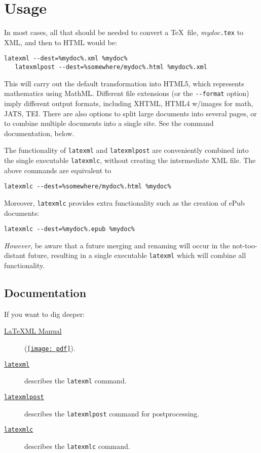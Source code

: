\documentclass{article}
\newcommand{\PDFIcon}{\texttt{[image: pdf]}}
\begin{document}
\section{Usage}\label{ussage}
In most cases, all that should be needed to convert
a \TeX\ file, \textit{mydoc}\texttt{.tex} to XML, and
then to HTML would be:
\begin{lstlisting}[style=shell]
   latexml --dest=%mydoc%.xml %mydoc%
   latexmlpost --dest=%somewhere/mydoc%.html %mydoc%.xml
\end{lstlisting}
This will carry out the default transformation into HTML5,
which represents mathematics using MathML.
Different file extensions (or the \verb|--format| option) imply different output formats,
including XHTML, HTML4 w/images for math, JATS, TEI.
There are also options to split large documents into several pages, or to combine multiple
documents into a single site.  See the command documentation, below.

The functionality of \texttt{latexml} and \texttt{latexmlpost} are conveniently
combined into the single executable \texttt{latexmlc}, without creating the
intermediate XML file.  The above commands are equivalent to
\begin{lstlisting}[style=shell]
   latexmlc --dest=%somewhere/mydoc%.html %mydoc%
\end{lstlisting}
Moreover, \texttt{latexmlc} provides extra functionality
such as the creation of ePub documents:
\begin{lstlisting}[style=shell]
   latexmlc --dest=%mydoc%.epub %mydoc%
\end{lstlisting}
\emph{However}, be aware that a future merging and renaming will occur in
the not-too-distant future, resulting in a single executable \texttt{latexml}
which will combine all functionality.

\subsection{Documentation}
If you want to dig deeper:
\begin{description}
\item[\href{manual/}{LaTeXML Manual}] (\href{manual.pdf}{\PDFIcon}).
\item[\href{manual/commands/latexml.html}{\texttt{latexml}}]
    describes the \texttt{latexml} command.
\item[\href{manual/commands/latexmlpost.html}{\texttt{latexmlpost}}]
   describes the \texttt{latexmlpost} command for postprocessing.
\item[\href{manual/commands/latexmlc.html}{\texttt{latexmlc}}]
   describes the \texttt{latexmlc} command.
\end{description}
\end{document}
